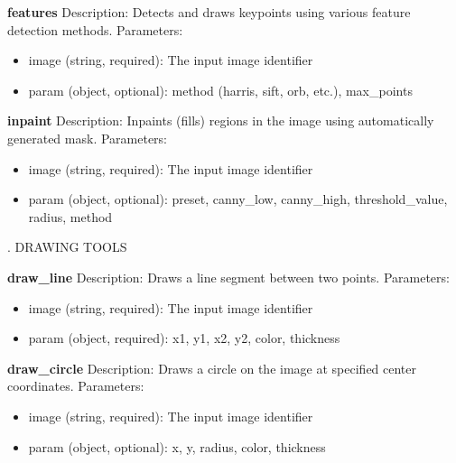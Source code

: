 \documentclass[runningheads]{llncs}
\begin{document}
\begin{tcolorbox}
\noindent \textbf{features}
\newline Description: Detects and draws keypoints using various feature detection methods.
\newline Parameters:
\begin{itemize}
    \item image (string, required): The input image identifier
    \item param (object, optional): method (harris, sift, orb, etc.), max\_points
\end{itemize}

\noindent \textbf{inpaint}
\newline Description: Inpaints (fills) regions in the image using automatically generated mask.
\newline Parameters:
\begin{itemize}
    \item image (string, required): The input image identifier
    \item param (object, optional): preset, canny\_low, canny\_high, threshold\_value, radius, method
\end{itemize}

\vspace{4mm}
. DRAWING TOOLS
\vspace{2mm}

\noindent \textbf{draw\_line}
\newline Description: Draws a line segment between two points.
\newline Parameters:
\begin{itemize}
    \item image (string, required): The input image identifier
    \item param (object, required): x1, y1, x2, y2, color, thickness
\end{itemize}

\noindent \textbf{draw\_circle}
\newline Description: Draws a circle on the image at specified center coordinates.
\newline Parameters:
\begin{itemize}
    \item image (string, required): The input image identifier
    \item param (object, optional): x, y, radius, color, thickness
\end{itemize}


\end{tcolorbox}
\end{document}
